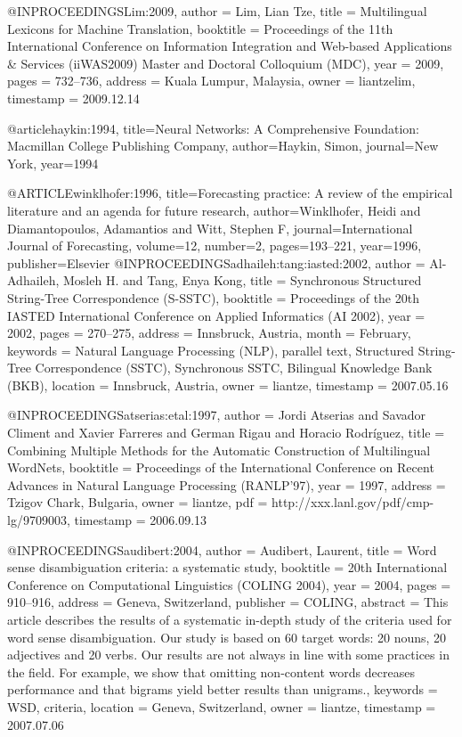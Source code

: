 
@INPROCEEDINGS{Lim:2009,
  author = {Lim, Lian Tze},
  title = {Multilingual Lexicons for Machine Translation},
  booktitle = {Proceedings of the 11th {I}nternational {C}onference on {I}nformation
	{I}ntegration and {W}eb-based {A}pplications \& {S}ervices ({iiWAS}2009)
	{M}aster and {D}octoral {C}olloquium ({MDC})},
  year = {2009},
  pages = {732--736},
  address = {Kuala Lumpur, Malaysia},
  owner = {liantzelim},
  timestamp = {2009.12.14}
}

@article{haykin:1994,
	title={Neural Networks: A Comprehensive Foundation: Macmillan College Publishing Company},
	author={Haykin, Simon},
	journal={New York},
	year={1994}
}


@ARTICLE{winklhofer:1996,
	title={Forecasting practice: A review of the empirical literature and an agenda for future research},
	author={Winklhofer, Heidi and Diamantopoulos, Adamantios and Witt, Stephen F},
	journal={International Journal of Forecasting},
	volume={12},
	number={2},
	pages={193--221},
	year={1996},
	publisher={Elsevier}
}
@INPROCEEDINGS{adhaileh:tang:iasted:2002,
  author = {Al-Adhaileh, Mosleh H. and Tang, Enya Kong},
  title = {{Synchronous Structured String-Tree Correspondence (S-SSTC)}},
  booktitle = {Proceedings of the 20th {IASTED} International Conference on Applied
	Informatics (AI 2002)},
  year = {2002},
  pages = {270--275},
  address = {Innsbruck, Austria},
  month = {February},
  keywords = {Natural Language Processing (NLP), parallel text, Structured String-Tree
	Correspondence (SSTC), Synchronous SSTC, Bilingual Knowledge Bank
	(BKB)},
  location = {Innsbruck, Austria},
  owner = {liantze},
  timestamp = {2007.05.16}
}

@INPROCEEDINGS{atserias:etal:1997,
  author = {Jordi Atserias and Savador Climent and Xavier Farreres and German
	Rigau and Horacio Rodr\'{i}guez},
  title = {Combining Multiple Methods for the Automatic Construction of Multilingual
	WordNets},
  booktitle = {Proceedings of the International Conference on Recent Advances in
	Natural Language Processing (RANLP'97)},
  year = {1997},
  address = {Tzigov Chark, Bulgaria},
  owner = {liantze},
  pdf = {http://xxx.lanl.gov/pdf/cmp-lg/9709003},
  timestamp = {2006.09.13}
}

@INPROCEEDINGS{audibert:2004,
  author = {Audibert, Laurent},
  title = {Word sense disambiguation criteria: a systematic study},
  booktitle = {20th International Conference on Computational Linguistics (COLING
	2004)},
  year = {2004},
  pages = {910--916},
  address = {Geneva, Switzerland},
  publisher = {COLING},
  abstract = {This article describes the results of a systematic in-depth study
	of the criteria used for word sense disambiguation. Our study is
	based on 60 target words: 20 nouns, 20 adjectives and 20 verbs. Our
	results are not always in line with some practices in the field.
	For example, we show that omitting non-content words decreases performance
	and that bigrams yield better results than unigrams.},
  keywords = {WSD, criteria},
  location = {Geneva, Switzerland},
  owner = {liantze},
  timestamp = {2007.07.06}
}

